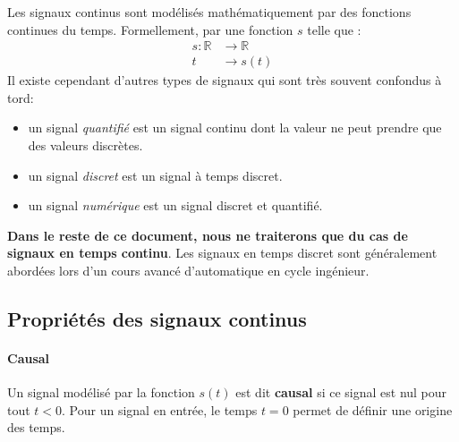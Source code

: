 Les signaux continus sont modélisés mathématiquement par des fonctions 
continues du temps. Formellement, par une fonction $s$ telle que :
\begin{align*}
s : \mathbb{R}&\rightarrow\mathbb{R} \\  
t&\rightarrow s(t) 
\end{align*}    
Il existe cependant d'autres types de signaux qui sont très souvent confondus 
à tord:
\begin{itemize}
    \item un signal \emph{quantifié} est un signal continu 
          dont la valeur ne peut prendre que des valeurs discrètes. 
    \item un signal \emph{discret} est un signal à temps discret.
    \item un signal \emph{numérique} est un signal discret et quantifié.   
\end{itemize}
\textbf{Dans le reste de ce document, nous ne traiterons que
du cas de signaux en temps continu}. Les signaux en temps discret
sont généralement abordées lors d'un cours 
avancé d'automatique en cycle ingénieur.
\subsection{Propriétés des signaux continus}
\paragraph{Causal}
Un signal modélisé par la fonction $s(t)$ est dit \textbf{causal}
si ce signal est nul pour tout $t<0$. Pour un signal en entrée, le temps 
$t=0$ permet de définir une origine des temps.
\begin{figure}[!h]
    \centering
    
\end{figure}
